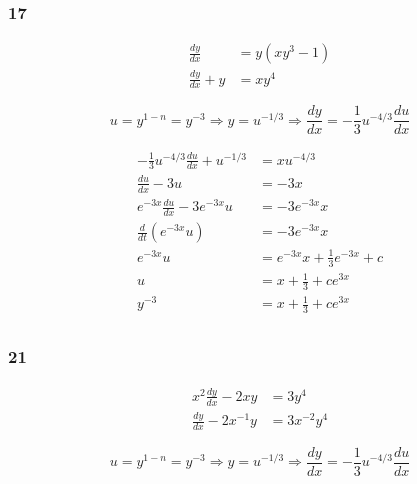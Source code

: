 \documentclass{article}
\begin{document}
\subsubsection{17}

\begin{align*}
  \frac{dy}{dx}     & = y (x y^3 - 1) \\
  \frac{dy}{dx} + y & = x y^4
\end{align*}

\[u = y^{1 - n} = y^{-3} \Rightarrow y = u^{-1 / 3} \Rightarrow \frac{dy}{dx} = -\frac{1}{3} u^{-4 / 3} \frac{du}{dx}\]

\begin{align*}
  -\frac{1}{3} u^{-4 / 3} \frac{du}{dx} + u^{-1/3} & = x u^{-4 / 3}                          \\
  \frac{du}{dx} - 3 u                              & = -3 x                                  \\
  e^{-3 x} \frac{du}{dx} - 3 e^{-3 x} u            & = -3 e^{-3 x} x                         \\
  \frac{d}{dt} (e^{-3 x} u)                        & = -3 e^{-3 x} x                         \\
  e^{-3 x} u                                       & = e^{-3 x} x + \frac{1}{3} e^{-3 x} + c \\
  u                                                & = x + \frac{1}{3} + c e^{3 x}           \\
  y^{-3}                                           & = x + \frac{1}{3} + c e^{3 x}           \\
\end{align*}

\subsubsection{21}

\begin{align*}
  x^2 \frac{dy}{dx} - 2 x y  & = 3 y^4        \\
  \frac{dy}{dx} - 2 x^{-1} y & = 3 x^{-2} y^4
\end{align*}

\[u = y^{1 - n} = y^{-3} \Rightarrow y = u^{-1 / 3} \Rightarrow \frac{dy}{dx} = -\frac{1}{3} u ^{-4 / 3} \frac{du}{dx}\]
\end{document}
